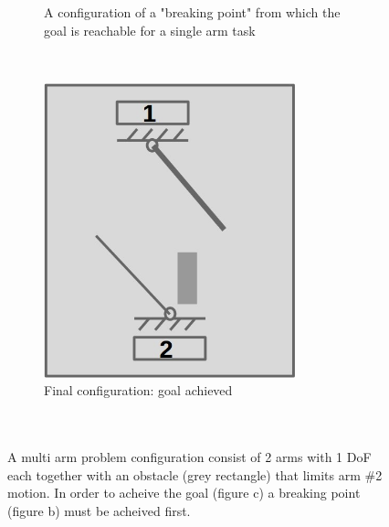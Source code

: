 \documentclass[english]{article}
\theoremstyle{definition}
\begin{document}
\begin{figure}[t]
\begin{subfigure}[b]{0.3\textwidth}
        \caption{A configuration of a "breaking point" from which the goal is reachable for a single arm task}
        \label{fig:breaking_point}
    \end{subfigure}  
    ~
    \begin{subfigure}[b]{0.3\textwidth}
    		\centering
        \includegraphics[width=0.8\textwidth]{final_configuration}
        \caption{Final configuration: goal achieved \\ ~~\\~~ }
        \label{fig:final_configuration}
    \end{subfigure}

    \caption{A multi arm problem configuration consist of 2 arms with 1 DoF each together with an obstacle (grey rectangle) that limits arm \#2 motion. In order to acheive the goal (figure c) a breaking point (figure b) must be acheived first. }\label{fig:local_minima_example}
\end{figure}




\newpage


\newpage

\end{document}
